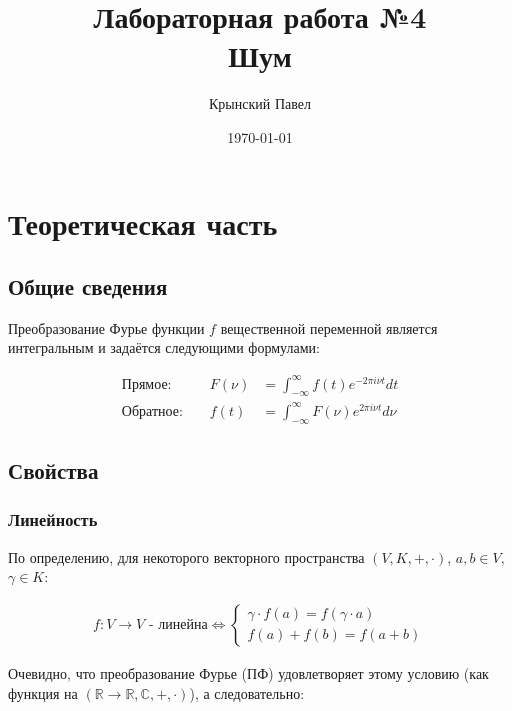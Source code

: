 \documentclass[a4paper,12pt]{report}
\title{Лабораторная работа №4\\Шум}
\author{Крынский Павел}
\date{\today}
\begin{document}
\maketitle
\tableofcontents
\listoffigures
\lstlistoflistings

\maketitle

\chapter{Теоретическая часть}
\section{Общие сведения}

Преобразование Фурье функции $f$ вещественной переменной является интегральным и задаётся следующими формулами: 
    
\[
    \begin{aligned}
        \text{Прямое: } && F(\nu) &= \int_{-\infty}^{\infty} f(t) e^{-2\pi i\nu t} dt \\
        \text{Обратное: } && f(t) &=  \int_{-\infty}^{\infty} F(\nu) e^{2\pi i\nu t} d\nu
    \end{aligned}
\]

\section{Свойства}
\subsection{Линейность}
    
По определению, для некоторого векторного пространства $(V,K,+,\cdot)$, $a,b \in V$, $\gamma \in K$:

\[
    \begin{aligned}
        f: V \rightarrow V \text{ - линейна}
        \Longleftrightarrow
        \begin{cases}
                \gamma\cdot f(a) = f(\gamma\cdot a) \\
                f(a) + f(b) = f(a + b)
        \end{cases}
    \end{aligned}
\]
    
Очевидно, что преобразование Фурье (ПФ) удовлетворяет этому условию (как функция на $(\mathbb{R} \rightarrow \mathbb{R},\mathbb{C},+,\cdot)$), а следовательно:
\end{document}
